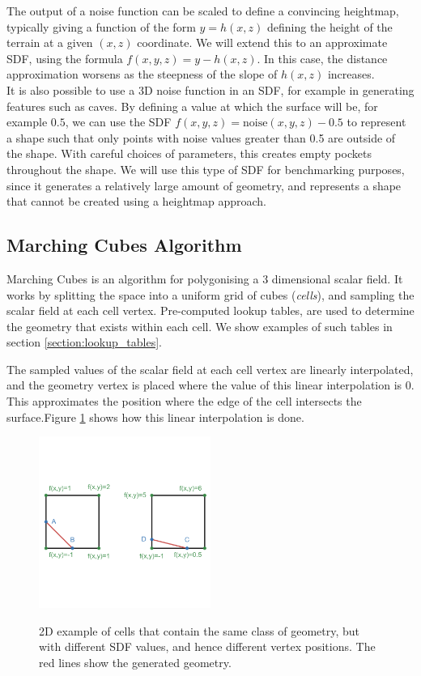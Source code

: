 \documentclass[11pt]{article}
\begin{document}
The output of a noise function can be scaled to define a convincing heightmap, typically giving a function of the form $y = h\left(x,z\right)$ defining the height of the terrain at a given $\left(x,z\right)$ coordinate. We will extend this to an approximate SDF, using the formula $f\left(x,y,z\right) = y - h\left(x,z\right)$. In this case, the distance approximation worsens as the steepness of the slope of $h\left(x,z\right)$ increases.
\\
It is also possible to use a 3D noise function in an SDF, for example in generating features such as caves. By defining a value at which the surface will be, for example $0.5$, we can use the SDF $f\left(x,y,z\right) = \mathrm{noise}\left(x,y,z\right) - 0.5$ to represent a shape such that only points with noise values greater than 0.5 are outside of the shape. With careful choices of parameters, this creates empty pockets throughout the shape. We will use this type of SDF for benchmarking purposes, since it generates a relatively large amount of geometry, and represents a shape that cannot be created using a heightmap approach. 

\subsection{Marching Cubes Algorithm}
\label{section:mc}
Marching Cubes is an algorithm for polygonising a 3 dimensional scalar field. It works by splitting the space into a uniform grid of cubes (\textit{cells}), and sampling the scalar field at each cell vertex. Pre-computed lookup tables, are used to determine the geometry that exists within each cell. We show examples of such tables in section \ref{section:lookup_tables}. 

The sampled values of the scalar field at each cell vertex are linearly interpolated, and the geometry vertex is placed where the value of this linear interpolation is 0. This approximates the position where the edge of the cell intersects the surface.Figure \ref{fig:linear_interpolation} shows how this linear interpolation is done.

\begin{figure}
  \caption{2D example of cells that contain the same class of geometry, but with different SDF values, and hence different vertex positions. The red lines show the generated geometry.}
  \includegraphics[width=0.5\textwidth]{linear_interpolation.png}
  \label{fig:linear_interpolation}
\end{figure}
\end{document}
